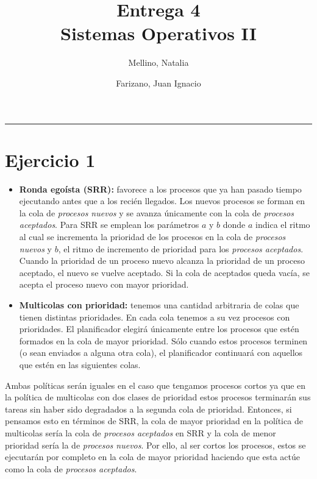 \documentclass[11pt]{article}
\title{
    Entrega 4 \\
    \large Sistemas Operativos II}
\author{Mellino, Natalia \and Farizano, Juan Ignacio}
\date{}
\begin{document}
\maketitle

\noindent\rule{\textwidth}{1pt}

\section*{Ejercicio 1}

\begin{itemize}
    \item \textbf{Ronda egoísta (SRR):} favorece a los procesos que ya han pasado
          tiempo ejecutando antes que a los recién llegados. Los nuevos
          procesos se forman en la cola de \emph{procesos nuevos} y se avanza
          únicamente con la cola de \emph{procesos aceptados}. Para SRR se
          emplean los parámetros $a$ y $b$ donde $a$ indica el ritmo al cual
          se incrementa la prioridad de los procesos en la cola de \emph{procesos nuevos}
          y $b$, el ritmo de incremento de prioridad para los \emph{procesos aceptados}.
          Cuando la prioridad de un proceso nuevo alcanza la prioridad de un proceso
          aceptado, el nuevo se vuelve aceptado. Si la cola de aceptados queda vacía, se
          acepta el proceso nuevo con mayor prioridad.
    \item \textbf{Multicolas con prioridad:} tenemos una cantidad arbitraria de colas que
          tienen distintas prioridades. En cada cola tenemos a su vez procesos con prioridades.
          El planificador elegirá únicamente entre los procesos que estén formados en la cola de 
          mayor prioridad. Sólo cuando estos procesos terminen (o sean enviados a alguna otra cola),
          el planificador continuará con aquellos que estén en las siguientes colas.
\end{itemize}

Ambas políticas serán iguales en el caso que tengamos procesos cortos ya que en la política
de multicolas con dos clases de prioridad estos procesos terminarán sus tareas sin haber 
sido degradados a la segunda cola de prioridad. Entonces, si pensamos esto en términos 
de SRR, la cola de mayor prioridad en la política de multicolas sería la cola de 
\emph{procesos aceptados} en SRR y la cola de menor prioridad sería la de \emph{procesos nuevos}. 
Por ello, al ser cortos los procesos, estos se ejecutarán por completo en la cola de mayor prioridad 
haciendo que esta actúe como la cola de \emph{procesos aceptados}.
\end{document}
